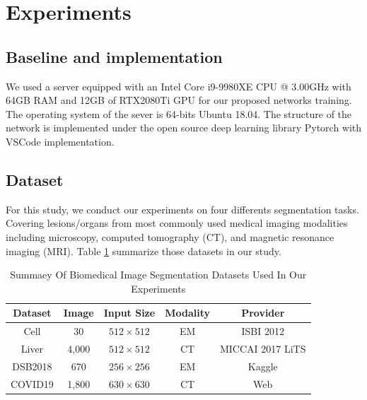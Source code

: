 \documentclass[UTF8]{article} %
\begin{document}
\section{Experiments}
\subsection{Baseline and implementation}
We used a server equipped with an Intel Core i9-9980XE CPU @ 3.00GHz with 64GB RAM and 12GB of RTX2080Ti GPU for
our proposed networks training. The operating system of the sever is 64-bits Ubuntu 18.04. The structure of the network 
is implemented under the open source deep learning library Pytorch with VSCode implementation.

\subsection{Dataset}
For this study, we conduct our experiments on four differents segmentation tasks. 
Covering lesions/organs from most commonly used medical imaging modalities including microscopy, 
computed tomography (CT), and magnetic resonance imaging (MRI).  Table \ref{dataset-table} summarize those datasets in our study.

\begin{table}[ht]
  \vspace{-2mm}
  \begin{center}\small
  \caption{Summaey Of Biomedical Image Segmentation Datasets Used In Our Experiments}
  \label{dataset-table}
  \begin{tabular}{ccccc}
    
  \toprule
  Dataset & Image & Input Size & Modality & Provider\\
  \midrule
  Cell & 30 & $512\times 512$  & EM      & ISBI 2012\cite{isbicell}   \\
  Liver    & 4,000 & $512\times 512$       & CT     & MICCAI 2017 LiTS\cite{liver}  \\
  DSB2018      & 670 & $256\times 256$      & EM      & Kaggle\cite{dsb2018} \\
  COVID19         & 1,800 & $630\times 630$     & CT     & Web\cite{covid19,covid19_2}  \\
\bottomrule    
  \end{tabular}
  \end{center}
  \vspace{-4mm}
  \end{table}
\end{document}
